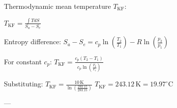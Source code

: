 Thermodynamic mean temperature \( T_{\text{KF}} \):  

\( T_{\text{KF}} = \frac{\int T dS}{S_a - S_e} \)  

Entropy difference:  
\( S_a - S_e = c_p \ln \left( \frac{T_2}{T_1} \right) - R \ln \left( \frac{p_2}{p_1} \right) \)  

For constant \( c_p \):  
\( T_{\text{KF}} = \frac{c_p (T_2 - T_1)}{c_p \ln \left( \frac{T_2}{T_1} \right)} \)  

Substituting:  
\( T_{\text{KF}} = \frac{10 \, \text{K}}{\ln \left( \frac{293.15}{283.15} \right)} \)  
\( T_{\text{KF}} = 243.12 \, \text{K} = 19.97^\circ \text{C} \)  

---